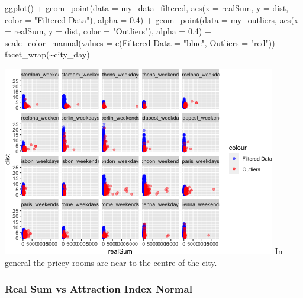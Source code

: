 \documentclass[
]{article}
\newenvironment{Shaded}{\begin{snugshade}}{\end{snugshade}}
\newcommand{\AttributeTok}[1]{\textcolor[rgb]{0.77,0.63,0.00}{#1}}
\newcommand{\FloatTok}[1]{\textcolor[rgb]{0.00,0.00,0.81}{#1}}
\newcommand{\FunctionTok}[1]{\textcolor[rgb]{0.00,0.00,0.00}{#1}}
\newcommand{\NormalTok}[1]{#1}
\newcommand{\OtherTok}[1]{\textcolor[rgb]{0.56,0.35,0.01}{#1}}
\newcommand{\SpecialCharTok}[1]{\textcolor[rgb]{0.00,0.00,0.00}{#1}}
\newcommand{\StringTok}[1]{\textcolor[rgb]{0.31,0.60,0.02}{#1}}
\begin{document}
\begin{Shaded}
\begin{Highlighting}[]
\FunctionTok{ggplot}\NormalTok{() }\SpecialCharTok{+} \FunctionTok{geom\_point}\NormalTok{(}\AttributeTok{data =}\NormalTok{ my\_data\_filtered, }\FunctionTok{aes}\NormalTok{(}\AttributeTok{x =}\NormalTok{ realSum,}
    \AttributeTok{y =}\NormalTok{ dist, }\AttributeTok{color =} \StringTok{"Filtered Data"}\NormalTok{), }\AttributeTok{alpha =} \FloatTok{0.4}\NormalTok{) }\SpecialCharTok{+} \FunctionTok{geom\_point}\NormalTok{(}\AttributeTok{data =}\NormalTok{ my\_outliers,}
    \FunctionTok{aes}\NormalTok{(}\AttributeTok{x =}\NormalTok{ realSum, }\AttributeTok{y =}\NormalTok{ dist, }\AttributeTok{color =} \StringTok{"Outliers"}\NormalTok{), }\AttributeTok{alpha =} \FloatTok{0.4}\NormalTok{) }\SpecialCharTok{+}
    \FunctionTok{scale\_color\_manual}\NormalTok{(}\AttributeTok{values =} \FunctionTok{c}\NormalTok{(}\StringTok{\textasciigrave{}}\AttributeTok{Filtered Data}\StringTok{\textasciigrave{}} \OtherTok{=} \StringTok{"blue"}\NormalTok{, }\AttributeTok{Outliers =} \StringTok{"red"}\NormalTok{)) }\SpecialCharTok{+}
    \FunctionTok{facet\_wrap}\NormalTok{(}\SpecialCharTok{\textasciitilde{}}\NormalTok{city\_day)}
\end{Highlighting}
\end{Shaded}

\includegraphics{Project_files/figure-latex/unnamed-chunk-15-2.png} In
general the pricey rooms are near to the centre of the city.

\hypertarget{real-sum-vs-attraction-index-normal}{%
\subsubsection{Real Sum vs Attraction Index
Normal}\label{real-sum-vs-attraction-index-normal}}
\end{document}
